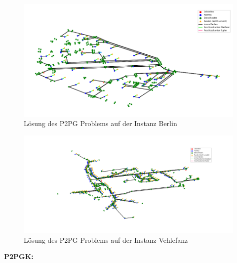 \documentclass[11pt,a4paper]{article}
\theoremstyle{my_th_style1}
\begin{document}
\begin{figure}[ht]\label{p2pg_b_pic}
\begin{center}
	\begin{minipage}{15.0cm}
		\includegraphics[width=1\textwidth]{./Bilder/P2PG_Berlin}
		\caption{Lösung des P2PG Problems auf der Instanz Berlin}
	\end{minipage}
\end{center}
\end{figure}

\begin{figure}[ht]\label{p2pg_v_pic}
\begin{center}
	\begin{minipage}{15.0cm}
		\includegraphics[width=1\textwidth]{./Bilder/P2PG_Vehlefanz}
		\caption{Lösung des P2PG Problems auf der Instanz Vehlefanz}
	\end{minipage}
\end{center}
\end{figure}

\textbf{P2PGK:}
\end{document}
